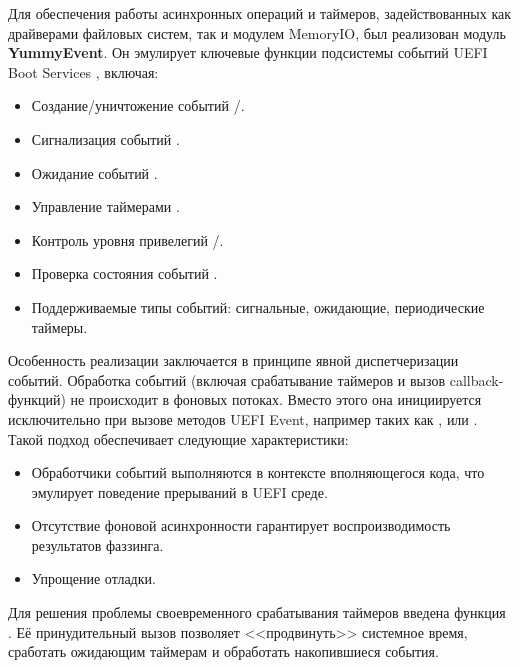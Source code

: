 Для обеспечения работы асинхронных операций и таймеров, задействованных как драйверами файловых систем, так и модулем MemoryIO, был реализован модуль \textbf{YummyEvent}. Он эмулирует ключевые функции подсистемы событий UEFI Boot Services \cite{UEFISpec}, включая:
\begin{itemize}
	 \item Создание/уничтожение событий /.
	 \item Сигнализация событий .
	 \item Ожидание событий .
	 \item Управление таймерами .
	 \item Контроль уровня привелегий /.
	 \item Проверка состояния событий .
	 \item Поддерживаемые типы событий: сигнальные, ожидающие, периодические таймеры.
\end{itemize}

Особенность реализации заключается в принципе явной диспетчеризации событий. Обработка событий (включая срабатывание таймеров и вызов callback-функций) не происходит в фоновых потоках. Вместо этого она инициируется исключительно при вызове методов UEFI Event, например таких как ,  или . Такой подход обеспечивает следующие характеристики:
\begin{itemize}
	\item Обработчики событий выполняются в контексте вполняющегося кода, что эмулирует поведение прерываний в UEFI среде.
	\item Отсутствие фоновой асинхронности гарантирует воспроизводимость результатов фаззинга.
	\item Упрощение отладки.
\end{itemize}

Для решения проблемы своевременного срабатывания таймеров введена функция . Её принудительный вызов позволяет <<продвинуть>> системное время, сработать ожидающим таймерам и обработать накопившиеся события. 
